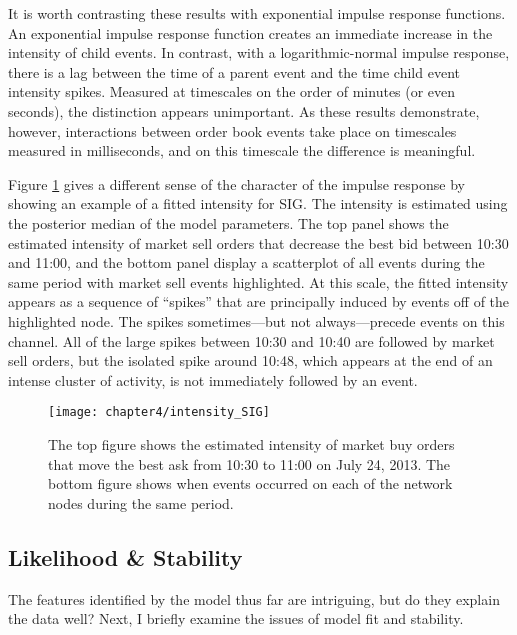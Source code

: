 		It is worth contrasting these results with exponential impulse response functions. An exponential impulse response function creates an immediate increase in the intensity of child events. In contrast, with a logarithmic-normal impulse response, there is a lag between the time of a parent event and the time child event intensity spikes. Measured at timescales on the order of minutes (or even seconds), the distinction appears unimportant. As these results demonstrate, however, interactions between order book events take place on timescales measured in milliseconds, and on this timescale the difference is meaningful.

		Figure \ref{fig:intensity_SIG} gives a different sense of the character of the impulse response by showing an example of a fitted intensity for SIG. The intensity is estimated using the posterior median of the model parameters. The top panel shows the estimated intensity of market sell orders that decrease the best bid between 10:30 and 11:00, and the bottom panel display a scatterplot of all events during the same period with market sell events highlighted. At this scale, the fitted intensity appears as a sequence of ``spikes'' that are principally induced by events off of the highlighted node. The spikes sometimes---but not always---precede events on this channel. All of the large spikes between 10:30 and 10:40 are followed by market sell orders, but the isolated spike around 10:48, which appears at the end of an intense cluster of activity, is not immediately followed by an event.

		\begin{figure}[p]
			\small
			\linespread{1}
			\centering
			\texttt{[image: chapter4/intensity\_SIG]}
			\captionsetup{skip=-20pt, labelsep=colon, font=footnotesize, width=\linewidth}
			\caption[Fitted intensity: SIG]{The top figure shows the estimated intensity of market buy orders that move the best ask from 10:30 to 11:00 on July 24, 2013. The bottom figure shows when events occurred on each of the network nodes during the same period.}
			\label{fig:intensity_SIG}
		\end{figure}

	\subsection{Likelihood \& Stability}
		The features identified by the model thus far are intriguing, but do they explain the data well? Next, I briefly examine the issues of model fit and stability.

